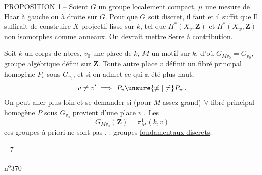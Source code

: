 PROPOSITION 1.-- \uline{Soient} $G$ \uline{un groupe localement compact}, $\mu$ \uline{une mesure de Haar à
gauche ou à droite sur} $G$. \uline{Pour que} $G$ \uline{soit discret}, \uline{il faut et il suffit que}
Il suffirait de construire $X$ projectif lisse sur $k$, tel que $H^*(X_v,\mathbf Z)$ et $H^*(X_w,\mathbf Z)$ non isomorphes comme \uline{anneaux}. On devrait mettre Serre à contribution.

Soit $k$ un corps de nbres, $v_0$ une place de $k$, $M$ un motif sur $k$, d'où $G_{Mv_0}=G_{v_0}$, groupe algébrique \uline{défini sur} $\mathbf Z$. Toute autre place  $v$ définit un fibré principal homogène $P_v$ sous $G_{v_0}$, et si on admet ce qui a été  plus haut, 
\[
v\ne v'\ \Longrightarrow\ P_v\unsure{\not\simeq|\ne}P_{v'}.
\]
On peut aller plus loin et se demander si  (pour $M$ assez grand) \uline{$\forall$} fibré principal homogène $P$ sous $G_{v_0}$ provient d'une place $v$ .
Les  
\[
G_{Mv_0}(\mathbf Z)=\pi^1_M(k,v)
\]
ces groupes à priori ne sont pas .
: groupes \uline{fondamentaux  discrets}.
\begin{center}-- 7 --\end{center}\hfill n\textsuperscript{o}370

